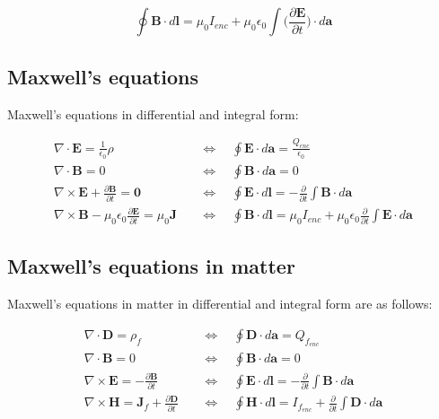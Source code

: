 \documentclass[a4paper]{article}
\begin{document}
\begin{equation}
    \oint \bm{B}\cdot d\bm{l}=\mu_0I_{enc}+\mu_0\epsilon_0\int \bigg(\frac{\partial\bm{E}}{\partial t}\bigg)\cdot d\bm{a}
\end{equation}

\subsection{Maxwell's equations}

Maxwell's equations in differential and integral form:

\begin{align}
    \nabla\cdot\bm{E}=\frac{1}{\epsilon_0}\rho\quad &\Leftrightarrow\quad\oint \bm{E}\cdot d\bm{a}=\frac{Q_{enc}}{\epsilon_0} \\
    \nabla\cdot\bm{B}=0\quad &\Leftrightarrow\quad\oint\bm{B}\cdot d\bm{a}=0 \\ 
    \nabla\times\bm{E}+\frac{\partial\bm{B}}{\partial t}=\bm{0}\quad &\Leftrightarrow\quad\oint \bm{E}\cdot d\bm{l}=-\frac{\partial}{\partial t}\int \bm{B}\cdot d\bm{a} \\
    \nabla\times\bm{B}-\mu_0\epsilon_0\frac{\partial\bm{E}}{\partial t}=\mu_0\bm{J}\quad &\Leftrightarrow\quad\oint \bm{B}\cdot d\bm{l}=\mu_0I_{enc}+\mu_0\epsilon_0\frac{\partial}{\partial t}\int \bm{E}\cdot d\bm{a}
\end{align}

\subsection{Maxwell's equations in matter}

Maxwell's equations in matter in differential and integral form are as follows: 

\begin{align}
    \nabla\cdot\bm{D}=\rho_{f}\quad &\Leftrightarrow\quad\oint \bm{D}\cdot d\bm{a}=Q_{f_{enc}} \\
    \nabla\cdot\bm{B}=0\quad &\Leftrightarrow\quad\oint\bm{B}\cdot d\bm{a}=0 \\ 
    \nabla\times\bm{E}=-\frac{\partial\bm{B}}{\partial t}\quad &\Leftrightarrow\quad\oint \bm{E}\cdot d\bm{l}=-\frac{\partial}{\partial t}\int \bm{B}\cdot d\bm{a} \\
    \nabla\times\bm{H}=\bm{J}_{f}+\frac{\partial\bm{D}}{\partial t}\quad &\Leftrightarrow\quad\oint \bm{H}\cdot d\bm{l}=I_{f_{enc}}+\frac{\partial}{\partial t}\int \bm{D}\cdot d\bm{a}
\end{align}
\end{document}
